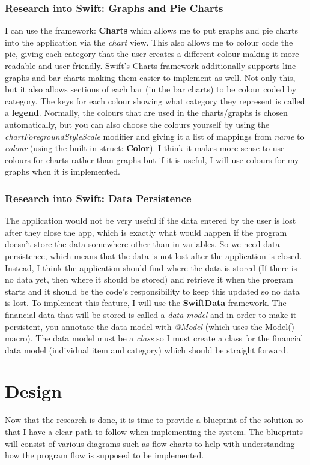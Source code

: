 \documentclass{article}
\begin{document}
\subsubsection{Research into Swift: Graphs and Pie Charts}
I can use the framework: \textbf{Charts} which allows me to put graphs and pie charts into the application via the \textit{chart} view. This also allows me to colour code the pie, giving each category that the user creates a different colour making it more readable and user friendly. Swift's Charts framework additionally supports line graphs and bar charts making them easier to implement as well. Not only this, but it also allows sections of each bar (in the bar charts) to be colour coded by category. The keys for each colour showing what category they represent is called a \textbf{legend}. Normally, the colours that are used in the charts/graphs is chosen automatically, but you can also choose the colours yourself by using the \textit{chartForegroundStyleScale} modifier and giving it a list of mappings from \textit{name} to \textit{colour} (using the built-in struct: \textbf{Color}). I think it makes more sense to use colours for charts rather than graphs but if it is useful, I will use colours for my graphs when it is implemented.

\subsubsection{Research into Swift: Data Persistence}
The application would not be very useful if the data entered by the user is lost after they close the app, which is exactly what would happen if the program doesn't store the data somewhere other than in variables. So we need data persistence, which means that the data is not lost after the application is closed. Instead, I think the application should find where the data is stored (If there is no data yet, then where it should be stored) and retrieve it when the program starts and it should be the code's responsibility to keep this updated so no data is lost. To implement this feature, I will use the \textbf{SwiftData} framework. The financial data that will be stored is called a \textit{data model} and in order to make it persistent, you annotate the data model with \textit{@Model} (which uses the Model() macro). The data model must be a \textit{class} so I must create a class for the financial data model (individual item and category) which should be straight forward.

\section{Design}
Now that the research is done, it is time to provide a blueprint of the solution so that I have a clear path to follow when implementing the system. The blueprints will consist of various diagrams such as flow charts to help with understanding how the program flow is supposed to be implemented.
\end{document}
